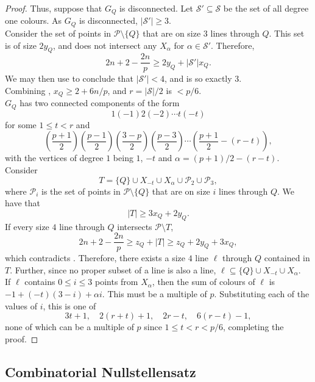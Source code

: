 \begin{proof}
		Thus, suppose that $G_Q$ is disconnected. Let $\mathcal{S}' \subseteq \mathcal{S}$ be the set of all degree one colours. As $G_Q$ is disconnected, $|\mathcal{S}'| \ge 3$.\\
		Consider the set of points in $\mathcal{P} \setminus \{Q\}$ that are on size $3$ lines through $Q$. This set is of size $2y_Q$, and does not intersect any $X_\alpha$ for $\alpha \in \mathcal{S}'$. Therefore,
		\begin{equation}
			\label{eqn: xQ yQ joint bound 2}
			2n + 2 - \frac{2n}{p} \ge 2 y_Q + |\mathcal{S}'| x_Q.
		\end{equation}
		We may then use  to conclude that $|\mathcal{S}'| < 4$, and is so exactly $3$.\\
		Combining , $x_Q \ge 2 + 6n/p$, and $r = |\mathcal{S}|/2$ is $< p/6$.\\
		$G_Q$ has two connected components of the form
		\[ 1 (-1) 2 (-2) \cdots t (-t) \]
		for some $1 \le t < r$ and
		\[ \left( \frac{p+1}{2} \right) \left( \frac{p-1}{2} \right) \left( \frac{3-p}{2} \right) \left( \frac{p-3}{2} \right) \cdots \left( \frac{p+1}{2} - (r-t) \right), \]
		with the vertices of degree $1$ being $1$, $-t$ and $\alpha = (p+1)/2 - (r-t)$. Consider
		\[ T = \{Q\} \cup X_{-t} \cup X_\alpha \cup \mathcal{P}_2 \cup \mathcal{P}_3, \]
		where $\mathcal{P}_i$ is the set of points in $\mathcal{P} \setminus \{Q\}$ that are on size $i$ lines through $Q$. We have that
		\[ |T| \ge 3x_Q + 2y_Q. \]
		If every size $4$ line through $Q$ intersects $\mathcal{P} \setminus T$,
		\[ 2n + 2 - \frac{2n}{p} \ge z_Q + |T| \ge z_Q + 2y_Q + 3x_Q, \]
		which contradicts . Therefore, there exists a size $4$ line $\ell$ through $Q$ contained in $T$. Further, since no proper subset of a line is also a line, $\ell \subseteq \{Q\} \cup X_{-t} \cup X_\alpha$.\\
		If $\ell$ contains $0 \le i \le 3$ points from $X_\alpha$, then the sum of colours of $\ell$ is $-1 + (-t)(3-i) + \alpha i$. This must be a multiple of $p$. Substituting each of the values of $i$, this is one of
		\[ 3t+1,\quad 2(r+t)+1,\quad 2r-t,\quad 6(r-t)-1, \]
		none of which can be a multiple of $p$ since $1 \le t < r < p/6$, completing the proof.
	\end{proof}

\subsection{Combinatorial Nullstellensatz}

